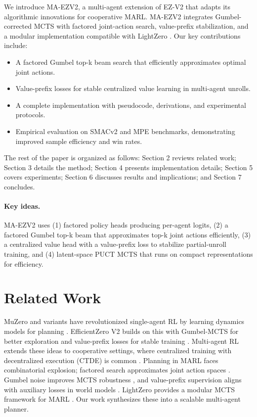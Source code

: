 \documentclass{article}
\begin{document}
We introduce MA-EZV2, a multi-agent extension of EZ-V2 that adapts its algorithmic innovations for cooperative MARL. MA-EZV2 integrates Gumbel-corrected MCTS with factored joint-action search, value-prefix stabilization, and a modular implementation compatible with LightZero \cite{lightzero2023}. Our key contributions include:
\begin{itemize}
  \item A factored Gumbel top-k beam search that efficiently approximates optimal joint actions.
  \item Value-prefix losses for stable centralized value learning in multi-agent unrolls.
  \item A complete implementation with pseudocode, derivations, and experimental protocols.
  \item Empirical evaluation on SMACv2 and MPE benchmarks, demonstrating improved sample efficiency and win rates.
\end{itemize}

The rest of the paper is organized as follows: Section 2 reviews related work; Section 3 details the method; Section 4 presents implementation details; Section 5 covers experiments; Section 6 discusses results and implications; and Section 7 concludes.

\paragraph{Key ideas.} MA-EZV2 uses (1) factored policy heads producing per-agent logits, (2) a factored Gumbel top-k beam that approximates top-k joint actions efficiently, (3) a centralized value head with a value-prefix loss to stabilize partial-unroll training, and (4) latent-space PUCT MCTS that runs on compact representations for efficiency.

\section{Related Work}
MuZero and variants have revolutionized single-agent RL by learning dynamics models for planning \cite{schrittwieser2019mastering}. EfficientZero V2 builds on this with Gumbel-MCTS for better exploration and value-prefix losses for stable training \cite{wang2024efficientzero}. Multi-agent RL extends these ideas to cooperative settings, where centralized training with decentralized execution (CTDE) is common \cite{lowe2017multi}. Planning in MARL faces combinatorial explosion; factored search approximates joint action spaces \cite{bellemare2024multiagent,madz2020}. Gumbel noise improves MCTS robustness \cite{wang2024efficientzero}, and value-prefix supervision aligns with auxiliary losses in world models \cite{hafner2023dreamer}. LightZero provides a modular MCTS framework for MARL \cite{lightzero2023}. Our work synthesizes these into a scalable multi-agent planner.
\end{document}
